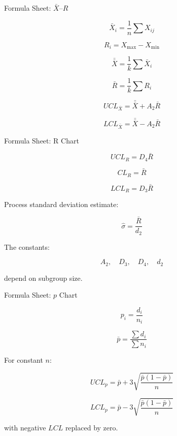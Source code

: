 \documentclass[aspectratio=169,10pt]{beamer}
\begin{document}

\begin{frame}[shrink=18]{Formula Sheet: $\bar X$--$R$}
\small

\[
\boxed{
\bar X_i=
\frac{1}{n}
\sum X_{ij}
}
\]

\[
\boxed{
R_i=X_{\max}-X_{\min}
}
\]

\[
\boxed{
\bar{\bar X}
=
\frac{1}{k}
\sum\bar X_i
}
\]

\[
\boxed{
\bar R=
\frac{1}{k}
\sum R_i
}
\]

\[
\boxed{
UCL_{\bar X}
=
\bar{\bar X}+A_2\bar R
}
\]

\[
\boxed{
LCL_{\bar X}
=
\bar{\bar X}-A_2\bar R
}
\]

\end{frame}


\begin{frame}[shrink=18]{Formula Sheet: R Chart}
\small

\[
\boxed{
UCL_R=D_4\bar R
}
\]

\[
\boxed{
CL_R=\bar R
}
\]

\[
\boxed{
LCL_R=D_3\bar R
}
\]

Process standard deviation estimate:

\[
\boxed{
\hat\sigma=\frac{\bar R}{d_2}
}
\]

The constants:

\[
A_2,\quad D_3,\quad D_4,\quad d_2
\]

depend on subgroup size.

\end{frame}


\begin{frame}[shrink=18]{Formula Sheet: $p$ Chart}
\small

\[
\boxed{
p_i=\frac{d_i}{n_i}
}
\]

\[
\boxed{
\bar p=
\frac{\sum d_i}{\sum n_i}
}
\]

For constant \(n\):

\[
\boxed{
UCL_p=
\bar p+
3\sqrt{
\frac{\bar p(1-\bar p)}{n}
}
}
\]

\[
\boxed{
LCL_p=
\bar p-
3\sqrt{
\frac{\bar p(1-\bar p)}{n}
}
}
\]

with negative \(LCL\) replaced by zero.

\end{frame}
\end{document}
